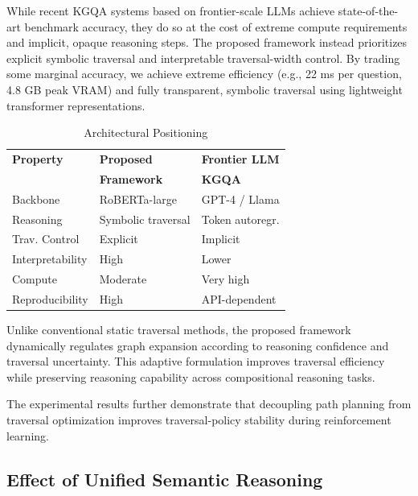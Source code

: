 \documentclass[10pt,conference]{IEEEtran}
\begin{document}
While recent KGQA systems based on frontier-scale LLMs achieve state-of-the-art benchmark accuracy, they do so at the cost of extreme compute requirements and implicit, opaque reasoning steps. The proposed framework instead prioritizes explicit symbolic traversal and interpretable traversal-width control. By trading some marginal accuracy, we achieve extreme efficiency (e.g., 22 ms per question, 4.8 GB peak VRAM) and fully transparent, symbolic traversal using lightweight transformer representations.

\begin{table}[h]
\centering
\caption{Architectural Positioning}
\label{tab:arch_positioning}
\begin{tabularx}{\columnwidth}{>{\raggedright\arraybackslash}p{1.8cm}
                               >{\raggedright\arraybackslash}X
                               >{\raggedright\arraybackslash}X}
\toprule
\textbf{Property} & \textbf{Proposed} & \textbf{Frontier LLM} \\
\textbf{} & \textbf{Framework} & \textbf{KGQA} \\
\midrule
Backbone       & RoBERTa-large     & GPT-4 / Llama \\
Reasoning      & Symbolic traversal & Token autoregr. \\
Trav. Control  & Explicit          & Implicit \\
Interpretability & High            & Lower \\
Compute        & Moderate          & Very high \\
Reproducibility & High             & API-dependent \\
\bottomrule
\end{tabularx}
\end{table}

Unlike conventional static traversal methods, the proposed framework dynamically regulates graph expansion according to reasoning confidence and traversal uncertainty. This adaptive formulation improves traversal efficiency while preserving reasoning capability across compositional reasoning tasks.

The experimental results further demonstrate that decoupling path planning from traversal optimization improves traversal-policy stability during reinforcement learning.

\subsection{Effect of Unified Semantic Reasoning}
\end{document}

